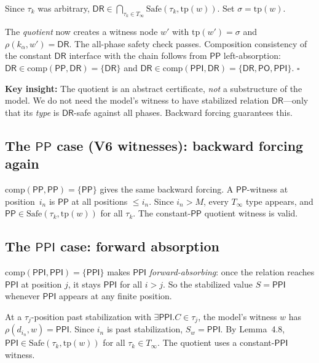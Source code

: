 \documentclass[11pt]{article}
\begin{document}
Since $\tau_k$ was arbitrary, $\mathsf{DR} \in
\bigcap_{\tau_k \in T_\infty} \mathrm{Safe}(\tau_k, \mathrm{tp}(w))$.
Set $\sigma = \mathrm{tp}(w)$.

The \emph{quotient} now creates a witness node $w'$ with
$\mathrm{tp}(w') = \sigma$ and $\rho(k_\alpha, w') = \mathsf{DR}$.
The all-phase safety check passes.  Composition consistency of the
constant $\mathsf{DR}$ interface with the chain follows from
$\mathsf{PP}$ left-absorption:
$\mathsf{DR} \in \mathrm{comp}(\mathsf{PP}, \mathsf{DR}) = \{\mathsf{DR}\}$
and
$\mathsf{DR} \in \mathrm{comp}(\mathsf{PPI}, \mathsf{DR}) = \{\mathsf{DR}, \mathsf{PO}, \mathsf{PPI}\}$.
\hfill$\square$

\textbf{Key insight:}\; The quotient is an abstract certificate,
\emph{not} a substructure of the model.  We do not need the model's
witness to have stabilized relation $\mathsf{DR}$---only that
its \emph{type} is $\mathsf{DR}$-safe against all phases.  Backward
forcing guarantees this.

\subsection{The $\mathsf{PP}$ case (V6 witnesses): backward forcing again}

$\mathrm{comp}(\mathsf{PP}, \mathsf{PP}) = \{\mathsf{PP}\}$ gives
the same backward forcing.  A $\mathsf{PP}$-witness at
position~$i_n$ is $\mathsf{PP}$ at all positions $\le i_n$.  Since
$i_n > M$, every $T_\infty$ type appears, and
$\mathsf{PP} \in \mathrm{Safe}(\tau_k, \mathrm{tp}(w))$ for all
$\tau_k$.  The constant-$\mathsf{PP}$ quotient witness is valid.

\subsection{The $\mathsf{PPI}$ case: forward absorption}

$\mathrm{comp}(\mathsf{PPI}, \mathsf{PPI}) = \{\mathsf{PPI}\}$
makes $\mathsf{PPI}$ \emph{forward-absorbing}: once the relation
reaches $\mathsf{PPI}$ at position $j$, it stays $\mathsf{PPI}$
for all $i > j$.  So the stabilized value $S = \mathsf{PPI}$
whenever $\mathsf{PPI}$ appears at any finite position.

At a $\tau_j$-position past stabilization with
$\exists\mathsf{PPI}.C \in \tau_j$, the model's witness $w$ has
$\rho(d_{i_n}, w) = \mathsf{PPI}$.  Since $i_n$ is past
stabilization, $S_w = \mathsf{PPI}$.  By Lemma~4.8,
$\mathsf{PPI} \in \mathrm{Safe}(\tau_k, \mathrm{tp}(w))$ for all
$\tau_k \in T_\infty$.  The quotient uses a
constant-$\mathsf{PPI}$ witness.
\end{document}

